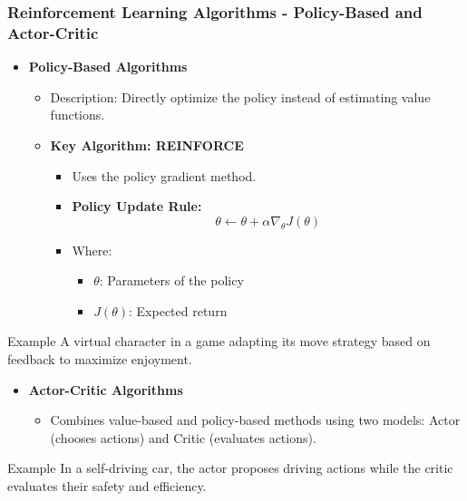\documentclass[aspectratio=169]{beamer}
\begin{document}
\begin{frame}[fragile]
    \frametitle{Reinforcement Learning Algorithms - Policy-Based and Actor-Critic}
    \begin{itemize}
        \item \textbf{Policy-Based Algorithms}
        \begin{itemize}
            \item Description: Directly optimize the policy instead of estimating value functions.
            \item \textbf{Key Algorithm: REINFORCE}
            \begin{itemize}
                \item Uses the policy gradient method.
                \item \textbf{Policy Update Rule:}
                \begin{equation}
                    \theta \leftarrow \theta + \alpha \nabla_{\theta} J(\theta)
                \end{equation}
                \item Where: 
                \begin{itemize}
                    \item \( \theta \): Parameters of the policy
                    \item \( J(\theta) \): Expected return
                \end{itemize}
            \end{itemize}
        \end{itemize}
    \end{itemize}
    \begin{block}{Example}
        A virtual character in a game adapting its move strategy based on feedback to maximize enjoyment.
    \end{block}

    \begin{itemize}
        \item \textbf{Actor-Critic Algorithms}
        \begin{itemize}
            \item Combines value-based and policy-based methods using two models: Actor (chooses actions) and Critic (evaluates actions).
        \end{itemize}
    \end{itemize}
    \begin{block}{Example}
        In a self-driving car, the actor proposes driving actions while the critic evaluates their safety and efficiency.
    \end{block}
\end{frame}
\end{document}
